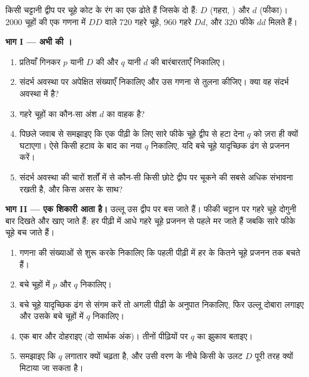 \begin{problem}
\label{pb:g12:selection-drift-speciation:1}
किसी चट्टानी द्वीप पर चूहे कोट के रंग का एक  ढोते हैं जिसके दो
 हैं: $D$ (गहरा, ) और $d$ (फीका)। 2000 चूहों की एक
गणना में  $DD$ वाले 720 गहरे चूहे, 960 गहरे $Dd$, और 320 फीके
$dd$ मिलते हैं।

\medskip
\noindent\textbf{भाग I --- अभी की ।}
\begin{enumerate}
  \item प्रतियाँ गिनकर $p$ यानी $D$ की और $q$ यानी $d$ की बारंबारताएँ
        निकालिए।
  \item संदर्भ अवस्था पर अपेक्षित  संख्याएँ निकालिए और उस गणना से
        तुलना कीजिए। क्या वह  संदर्भ अवस्था में है?
  \item गहरे चूहों का कौन-सा अंश $d$ का वाहक है?
  \item पिछले जवाब से समझाइए कि एक पीढ़ी के लिए सारे फीके चूहे द्वीप से हटा
        देना $q$ को ज़रा ही क्यों घटाएगा। ऐसे किसी हटाव के बाद का नया $q$
        निकालिए, यदि बचे चूहे यादृच्छिक ढंग से प्रजनन करें।
  \item संदर्भ अवस्था की चारों शर्तों में से कौन-सी किसी छोटे द्वीप पर
        चूकने की सबसे अधिक संभावना रखती है, और किस असर के साथ?
\end{enumerate}

\medskip
\noindent\textbf{भाग II --- एक शिकारी आता है।}
उल्लू उस द्वीप पर बस जाते हैं। फीकी चट्टान पर गहरे चूहे दोगुनी बार दिखते
और खाए जाते हैं: हर पीढ़ी में आधे गहरे चूहे प्रजनन से पहले मर जाते हैं जबकि
सारे फीके चूहे बच जाते हैं।
\begin{enumerate}[resume]
  \item गणना की संख्याओं से शुरू करके निकालिए कि पहली पीढ़ी में हर
         के कितने चूहे प्रजनन तक बचते हैं।
  \item बचे चूहों में $p$ और $q$ निकालिए।
  \item बचे चूहे यादृच्छिक ढंग से संगम करें तो अगली पीढ़ी के 
        अनुपात निकालिए, फिर उल्लू दोबारा लगाइए और उसके बचे चूहों में $q$
        निकालिए।
  \item एक बार और दोहराइए (दो सार्थक अंक)। तीनों पीढ़ियों पर $q$ का झुकाव
        बताइए।
  \item समझाइए कि $q$ लगातार क्यों चढ़ता है, और उसी वरण के नीचे किसी
          के उलट $D$ पूरी तरह क्यों मिटाया जा सकता है।
\end{enumerate}


\end{problem}
